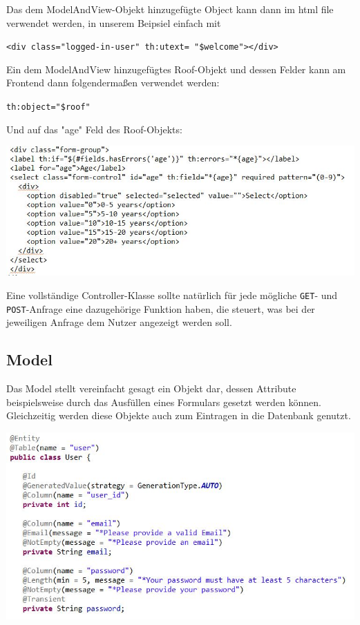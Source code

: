 \documentclass[12pt,a4paper]{article}
\begin{document}
\bigskip
\bigskip
Das dem ModelAndView-Objekt hinzugefügte Object kann dann im html file verwendet werden, in unserem Beipsiel einfach mit

\smallskip
\texttt{<div class="logged-in-user" th:utext= "\${welcome}"{}></div>}

\smallskip
Ein dem ModelAndView hinzugefügtes Roof-Objekt und dessen Felder kann am Frontend dann folgendermaßen verwendet werden:

\bigskip
\texttt{th:object="\${roof}"}

\bigskip
Und auf das "{}age"{} Feld des Roof-Objekts:

\bigskip
\includegraphics[scale=1]{./Graphics/controller_front}

\bigskip
\bigskip
Eine vollständige Controller-Klasse sollte natürlich für jede mögliche \texttt{GET}- und \texttt{POST}-Anfrage eine dazugehörige Funktion haben, die steuert, was bei der jeweiligen Anfrage dem Nutzer angezeigt werden soll.

\pagebreak


\subsection{Model}

Das Model stellt vereinfacht gesagt ein Objekt dar, dessen Attribute beispielsweise durch das Ausfüllen eines Formulars gesetzt werden können. Gleichzeitig werden diese Objekte auch zum Eintragen in die Datenbank genutzt.

\bigskip
\includegraphics[width=1.1\textwidth]{./Graphics/model_back}
\end{document}
